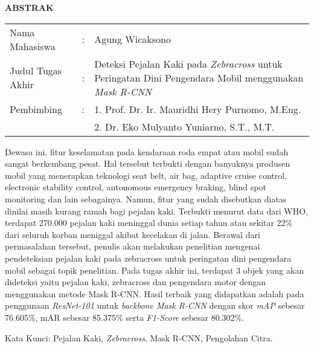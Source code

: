 \begin{center}
  \large\textbf{ABSTRAK}
\end{center}


\vspace{2ex}

\begingroup
  \setlength{\tabcolsep}{0pt}

  \noindent
  \begin{tabularx}{\textwidth}{l >{\centering}m{2em} X}
    Nama Mahasiswa    &:& Agung Wicaksono \\

    Judul Tugas Akhir &:&	Deteksi Pejalan Kaki pada \textit{Zebracross} untuk Peringatan Dini Pengendara Mobil menggunakan \textit{Mask R-CNN} \\

    Pembimbing        &:& 1. Prof. Dr. Ir. Mauridhi Hery Purnomo, M.Eng. \\
                      & & 2. Dr. Eko Mulyanto Yuniarno, S.T., M.T. \\
  \end{tabularx}
\endgroup

Dewasa ini, fitur keselamatan pada kendaraan roda empat atau mobil sudah sangat berkembang pesat. Hal tersebut terbukti dengan banyaknya produsen mobil yang menerapkan teknologi seat belt, air bag, adaptive cruise control, electronic stability control, autonomous emergency braking, blind spot monitoring dan lain sebagainya. Namun, fitur yang sudah disebutkan diatas dinilai masih kurang ramah bagi pejalan kaki. Terbukti menurut data dari WHO, terdapat 270.000 pejalan kaki meninggal dunia setiap tahun atau sekitar 22\% dari seluruh korban meniggal akibat kecelakan di jalan. Berawal dari permasalahan tersebut, penulis akan melakukan penelitian mengenai pendeteksian pejalan kaki pada zebracross untuk peringatan dini pengendara mobil sebagai topik penelitian. Pada tugas akhir ini, terdapat 3 objek yang akan dideteksi yaitu pejalan kaki, zebracross dan pengendara motor dengan menggunakan metode Mask R-CNN. Hasil terbaik yang didapatkan adalah pada penggunaan \textit{ResNet-101} untuk \textit{backbone Mask R-CNN} dengan skor \textit{mAP} sebesar 76.605\%, mAR sebesar 85.375\% serta \textit{F1-Score} sebesar 80.302\%.

Kata Kunci: Pejalan Kaki, \emph{Zebracross}, Mask R-CNN, Pengolahan Citra.
